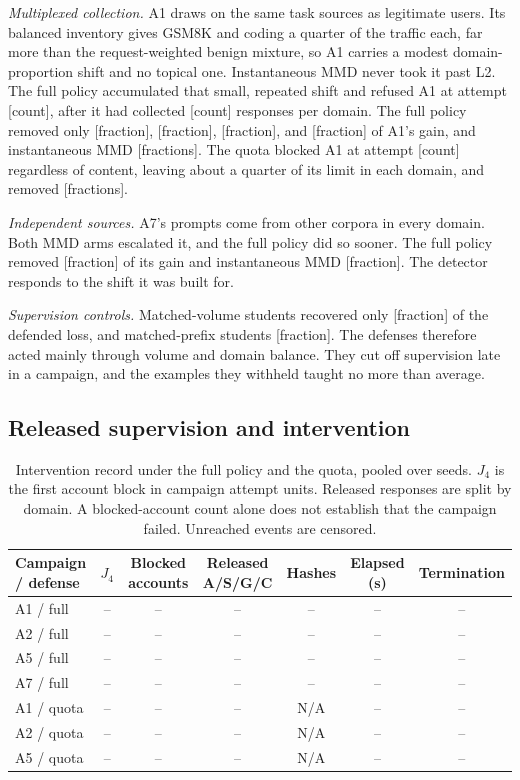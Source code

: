 \documentclass[journal]{IEEEtran}
\newcommand{\tbd}[1]{\textcolor{red!65!black}{[#1]}}
\newcommand{\pending}{\textcolor{red!65!black}{--}}
\begin{document}
\textit{Multiplexed collection.} A1 draws on the same task sources as legitimate users. Its balanced inventory gives GSM8K and coding a quarter of the traffic each, far more than the request-weighted benign mixture, so A1 carries a modest domain-proportion shift and no topical one. Instantaneous MMD never took it past L2. The full policy accumulated that small, repeated shift and refused A1 at attempt \tbd{count}, after it had collected \tbd{count} responses per domain. The full policy removed only \tbd{fraction}, \tbd{fraction}, \tbd{fraction}, and \tbd{fraction} of A1's gain, and instantaneous MMD \tbd{fractions}. The quota blocked A1 at attempt \tbd{count} regardless of content, leaving about a quarter of its limit in each domain, and removed \tbd{fractions}.

\textit{Independent sources.} A7's prompts come from other corpora in every domain. Both MMD arms escalated it, and the full policy did so sooner. The full policy removed \tbd{fraction} of its gain and instantaneous MMD \tbd{fraction}. The detector responds to the shift it was built for.

\textit{Supervision controls.} Matched-volume students recovered only \tbd{fraction} of the defended loss, and matched-prefix students \tbd{fraction}. The defenses therefore acted mainly through volume and domain balance. They cut off supervision late in a campaign, and the examples they withheld taught no more than average.

\subsection{Released supervision and intervention}
\begin{table}[!t]
\centering\footnotesize
\caption{Intervention record under the full policy and the quota, pooled over seeds. $J_4$ is the first account block in campaign attempt units. Released responses are split by domain. A blocked-account count alone does not establish that the campaign failed. Unreached events are censored.}
\label{tab:campaign}
\begin{tabularx}{\textwidth}{@{}Ycccccc@{}}\toprule
Campaign / defense & $J_4$ & Blocked accounts & Released A/S/G/C & Hashes & Elapsed (s) & Termination \\\midrule
A1 / full & \pending & \pending & \pending & \pending & \pending & \pending \\
A2 / full & \pending & \pending & \pending & \pending & \pending & \pending \\
A5 / full & \pending & \pending & \pending & \pending & \pending & \pending \\
A7 / full & \pending & \pending & \pending & \pending & \pending & \pending \\\midrule
A1 / quota & \pending & \pending & \pending & N/A & \pending & \pending \\
A2 / quota & \pending & \pending & \pending & N/A & \pending & \pending \\
A5 / quota & \pending & \pending & \pending & N/A & \pending & \pending \\\bottomrule
\end{tabularx}
\end{table}
\end{document}
